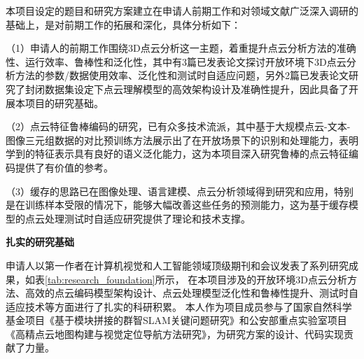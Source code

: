 \documentclass[12pt]{article}
\newcommand{\myEmph}[1]{\textbf{\textcolor[rgb]{0,0,0.25}{#1}}}
\begin{document}
本项目设定的题目和研究方案建立在申请人前期工作和对领域文献广泛深入调研的基础上，是对前期工作的拓展和深化，具体分析如下：

（1）申请人的前期工作围绕3D点云分析这一主题，着重提升点云分析方法的准确性、运行效率、鲁棒性和泛化性，其中有3篇已发表论文探讨开放环境下3D点云分析方法的参数/数据使用效率、泛化性和测试时自适应问题，另外2篇已发表论文研究了封闭数据集设定下点云理解模型的高效架构设计及准确性提升，因此具备了开展本项目的研究基础。

（2）点云特征鲁棒编码的研究，已有众多技术流派，其中基于大规模点云-文本-图像三元组数据的对比预训练方法展示出了在开放场景下的识别和处理能力，表明学到的特征表示具有良好的语义泛化能力，这为本项目深入研究鲁棒的点云特征编码提供了有价值的参考。

（3）缓存的思路已在图像处理、语言建模、点云分析领域得到研究和应用，特别是在训练样本受限的情况下，能够大幅改善这些任务的预测能力，这为基于缓存模型的点云处理测试时自适应研究提供了理论和技术支撑。

\myEmph{扎实的研究基础}

申请人以第一作者在计算机视觉和人工智能领域顶级期刊和会议发表了系列研究成果，如表\ref{tab:research_foundation}所示，
在本项目涉及的开放环境3D点云分析方法、高效的点云编码模型架构设计、点云处理模型泛化性和鲁棒性提升、测试时自适应技术等方面进行了扎实的科研积累。
本人作为项目成员参与了国家自然科学基金项目《基于模块拼接的群智SLAM关键问题研究》和公安部重点实验室项目《高精点云地图构建与视觉定位导航方法研究》，为研究方案的设计、代码实现贡献了力量。
\end{document}
